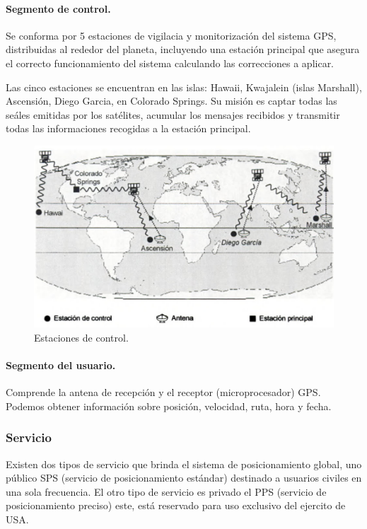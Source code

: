 \paragraph{Segmento de control.}

	Se conforma por 5 estaciones de vigilacia y monitorización del sistema GPS, distribuidas al rededor del planeta, incluyendo una estación principal que asegura el correcto funcionamiento del sistema calculando las correcciones a aplicar.
	
	Las cinco estaciones se encuentran en las islas: Hawaii, Kwajalein (islas Marshall), Ascensión, Diego Garcia, en Colorado Springs. Su misión es captar todas las seáles emitidas por los satélites, acumular los mensajes recibidos y transmitir todas las informaciones recogidas a la estación principal.
	
\begin{figure}[bp!]
	\centering
	\includegraphics[width=5in]{imgs/estacionControl}
	  \caption{Estaciones de control.}
\end{figure}
	
\paragraph{Segmento del usuario.}

	Comprende la antena de recepción y el receptor (microprocesador) GPS. Podemos obtener información sobre posición, velocidad, ruta, hora y fecha.

\subsubsection{Servicio}

Existen dos tipos de servicio que brinda el sistema de posicionamiento global, uno público SPS (servicio de posicionamiento estándar) destinado a usuarios civiles en una sola frecuencia. El otro tipo de servicio es privado el PPS (servicio de posicionamiento preciso) este, está reservado para uso exclusivo del ejercito de USA.

